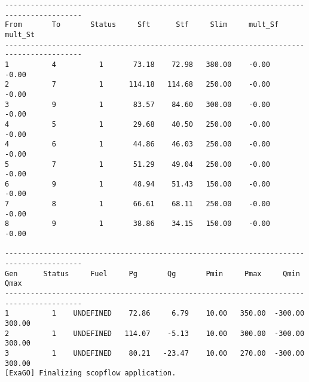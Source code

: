 \begin{lstlisting}
----------------------------------------------------------------------------------------
From       To       Status     Sft      Stf     Slim     mult_Sf  mult_St 
----------------------------------------------------------------------------------------
1          4          1       73.18    72.98   380.00    -0.00    -0.00
2          7          1      114.18   114.68   250.00    -0.00    -0.00
3          9          1       83.57    84.60   300.00    -0.00    -0.00
4          5          1       29.68    40.50   250.00    -0.00    -0.00
4          6          1       44.86    46.03   250.00    -0.00    -0.00
5          7          1       51.29    49.04   250.00    -0.00    -0.00
6          9          1       48.94    51.43   150.00    -0.00    -0.00
7          8          1       66.61    68.11   250.00    -0.00    -0.00
8          9          1       38.86    34.15   150.00    -0.00    -0.00

----------------------------------------------------------------------------------------
Gen      Status     Fuel     Pg       Qg       Pmin     Pmax     Qmin     Qmax  
----------------------------------------------------------------------------------------
1          1    UNDEFINED    72.86     6.79    10.00   350.00  -300.00   300.00
2          1    UNDEFINED   114.07    -5.13    10.00   300.00  -300.00   300.00
3          1    UNDEFINED    80.21   -23.47    10.00   270.00  -300.00   300.00
[ExaGO] Finalizing scopflow application.
\end{lstlisting}
